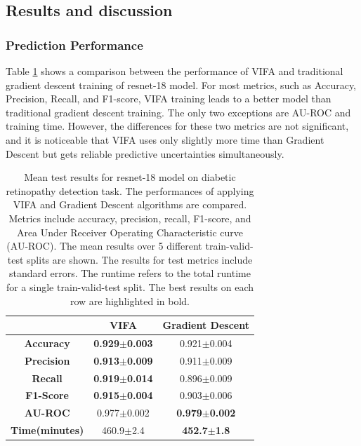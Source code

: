 \documentclass[10pt]{article} %
\begin{document}
\subsection{Results and discussion}

\subsubsection{Prediction Performance}
Table \ref{table: VIFA_GD_comparison} shows a comparison between the performance of VIFA and traditional gradient descent training of resnet-18 model. For most metrics, such as Accuracy, Precision, Recall, and F1-score, VIFA training leads to a better model than traditional gradient descent training. The only two exceptions are AU-ROC and training time. However, the differences for these two metrics are not significant, and it is noticeable that VIFA uses only slightly more time than Gradient Descent but gets reliable predictive uncertainties simultaneously. 

\begin{table}[!htp]
\caption{Mean test results for resnet-18 model on diabetic retinopathy detection task. The performances of applying VIFA and Gradient Descent algorithms are compared. Metrics include accuracy, precision, recall, F1-score, and Area Under Receiver Operating Characteristic curve (AU-ROC). The mean results over 5 different train-valid-test splits are shown. The results for test metrics include standard errors. The runtime refers to the total runtime for a single train-valid-test split. The best results on each row are highlighted in bold.}
\label{table: VIFA_GD_comparison}
\begin{center}
\begin{tabular}{c|c|c}
                   & \textbf{VIFA}        & \textbf{Gradient Descent} \\ \hline
\textbf{Accuracy}  & \textbf{0.929$\pm$0.003} & 0.921$\pm$0.004               \\
\textbf{Precision} & \textbf{0.913$\pm$0.009} & 0.911$\pm$0.009               \\
\textbf{Recall}    & \textbf{0.919$\pm$0.014} & 0.896$\pm$0.009               \\
\textbf{F1-Score}  & \textbf{0.915$\pm$0.004} & 0.903$\pm$0.006               \\
\textbf{AU-ROC}    & 0.977$\pm$0.002          & \textbf{0.979$\pm$0.002}      \\
\textbf{Time(minutes)}      & 460.9$\pm$2.4        & \textbf{452.7$\pm$1.8}   
\end{tabular}
\end{center}
\end{table}
\end{document}
